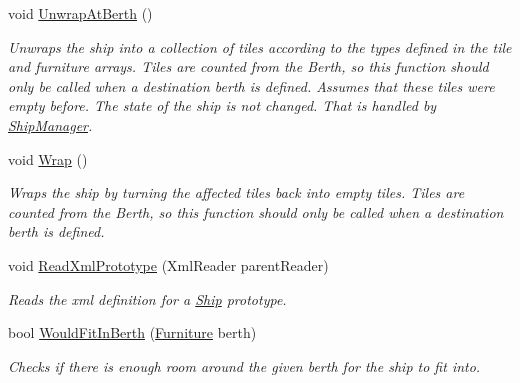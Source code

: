 \begin{DoxyCompactItemize}
void \hyperlink{class_ship_a56485e286ef7dcb757681217bcc796f5}{Unwrap\+At\+Berth} ()
\begin{DoxyCompactList}\small\item\em Unwraps the ship into a collection of tiles according to the types defined in the tile and furniture arrays. Tiles are counted from the Berth, so this function should only be called when a destination berth is defined. Assumes that these tiles were empty before. The state of the ship is not changed. That is handled by \hyperlink{class_ship_manager}{Ship\+Manager}. \end{DoxyCompactList}\item 
void \hyperlink{class_ship_ad0f53056aa94b27894bc9d8bb5601e16}{Wrap} ()
\begin{DoxyCompactList}\small\item\em Wraps the ship by turning the affected tiles back into empty tiles. Tiles are counted from the Berth, so this function should only be called when a destination berth is defined. \end{DoxyCompactList}\item 
void \hyperlink{class_ship_aa81fd20c93280bc0325cf0da26f14ca5}{Read\+Xml\+Prototype} (Xml\+Reader parent\+Reader)
\begin{DoxyCompactList}\small\item\em Reads the xml definition for a \hyperlink{class_ship}{Ship} prototype. \end{DoxyCompactList}\item 
bool \hyperlink{class_ship_a073f1568ef8d9ea7d04867b0b6ee4888}{Would\+Fit\+In\+Berth} (\hyperlink{class_furniture}{Furniture} berth)
\begin{DoxyCompactList}\small\item\em Checks if there is enough room around the given berth for the ship to fit into. \end{DoxyCompactList}\end{DoxyCompactItemize}
